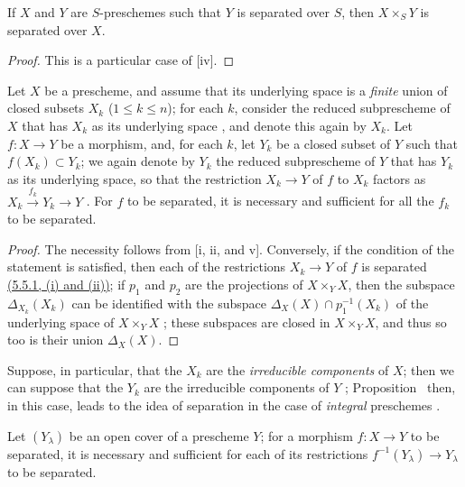 \begin{corollary}[5.5.3]
\label{I.5.5.3}
If $X$ and $Y$ are $S$-preschemes such that $Y$ is separated over $S$, then $X\times_S Y$ is separated over $X$.
\end{corollary}

\begin{proof}
This is a particular case of [iv].
\end{proof}

\begin{proposition}[5.5.4]
\label{I.5.5.4}
Let $X$ be a prescheme, and assume that its underlying space is a \emph{finite} union of closed subsets $X_k$ ($1\leq k\leq n$);
for each $k$, consider the reduced subprescheme of $X$ that has $X_k$ as its underlying space , and denote this again by $X_k$.
Let $f:X\to Y$ be a morphism, and, for each $k$, let $Y_k$ be a closed subset of $Y$ such that $f(X_k)\subset Y_k$;
we again denote by $Y_k$ the reduced subprescheme of $Y$ that has $Y_k$ as its underlying space, so that the restriction $X_k\to Y$ of $f$ to $X_k$ factors as $X_k\xrightarrow{f_k}Y_k\to Y$ .
For $f$ to be separated, it is necessary and sufficient for all the $f_k$ to be separated.
\end{proposition}

\begin{proof}
The necessity follows from [i, ii, and v].
Conversely, if the condition of the statement is satisfied, then each of the restrictions $X_k\to Y$ of $f$ is separated \hyperref[I.5.5.1]{(5.5.1, (i) and (ii))};
if $p_1$ and $p_2$ are the projections of $X\times_Y X$, then the subspace $\Delta_{X_k}(X_k)$ can be identified with the subspace $\Delta_X(X)\cap p_1^{-1}(X_k)$ of the underlying space of $X\times_Y X$ ;
these subspaces are closed in $X\times_Y X$, and thus so too is their union $\Delta_X(X)$.
\end{proof}

Suppose, in particular, that the $X_k$ are the \emph{irreducible components} of $X$;
then we can suppose that the $Y_k$ are the irreducible components of $Y$ ;
Proposition~ then, in this case, leads to the idea of separation in the case of \emph{integral} preschemes .

\begin{proposition}[5.5.5]
\label{I.5.5.5}
Let $(Y_\lambda)$ be an open cover of a prescheme $Y$;
for a morphism $f:X\to Y$ to be separated, it is necessary and sufficient for each of its restrictions $f^{-1}(Y_\lambda)\to Y_\lambda$ to be separated.
\end{proposition}

